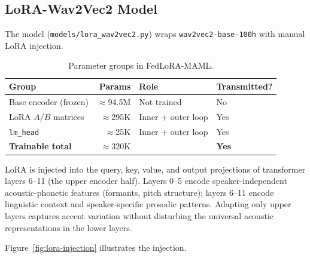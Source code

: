 \documentclass[12pt]{article}
\theoremstyle{plain}
\begin{document}
\subsection{LoRA-Wav2Vec2 Model}
\label{sec:lora-model}

The model (\verb|models/lora_wav2vec2.py|) wraps \texttt{wav2vec2-base-100h}
with manual LoRA injection.


\begin{table}[H]
\centering
\caption{Parameter groups in FedLoRA-MAML.}
\label{tab:param-groups}
\begin{tabular}{lrll}
\toprule
\textbf{Group} & \textbf{Params} & \textbf{Role} & \textbf{Transmitted?} \\
\midrule
Base encoder (frozen) & $\approx$94.5M & Not trained & No \\
LoRA $A$/$B$ matrices & $\approx$295K  & Inner + outer loop & Yes \\
\texttt{lm\_head}     & $\approx$25K   & Inner + outer loop & Yes \\
\midrule
\textbf{Trainable total} & $\approx$320K & & \textbf{Yes} \\
\bottomrule
\end{tabular}
\end{table}

LoRA is injected into the query, key, value, and output projections
of transformer layers 6--11 (the upper encoder half).
Layers 0--5 encode speaker-independent acoustic-phonetic features
(formants, pitch structure); layers 6--11 encode linguistic context and
speaker-specific prosodic patterns.
Adapting only upper layers captures accent variation without disturbing the
universal acoustic representations in the lower layers.

Figure~\ref{fig:lora-injection} illustrates the injection.

\end{document}
